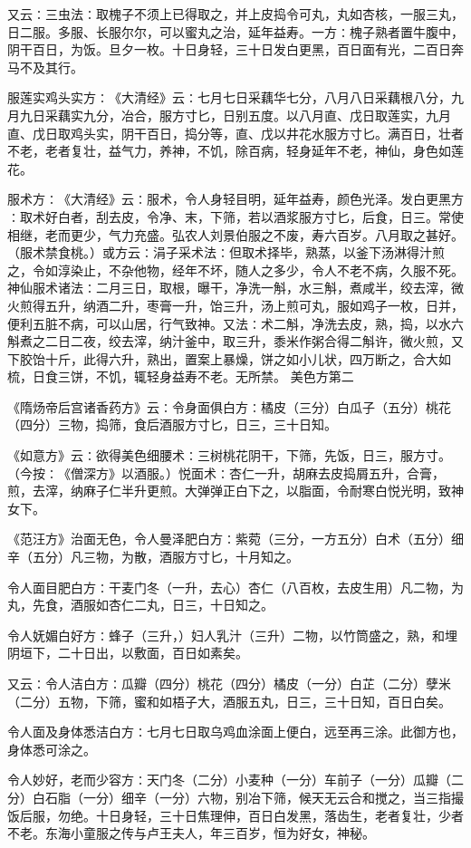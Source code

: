 \documentclass[a4paper,12pt,UTF8,twoside]{ctexbook}
\begin{document}
又云∶三虫法∶取槐子不须上已得取之，并上皮捣令可丸，丸如杏核，一服三丸，日二服。多服、长服尔尔，可以蜜丸之治，延年益寿。一方∶槐子熟者置牛腹中，阴干百日，为饭。旦夕一枚。十日身轻，三十日发白更黑，百日面有光，二百日奔马不及其行。

服莲实鸡头实方∶《大清经》云∶七月七日采藕华七分，八月八日采藕根八分，九月九日采藕实九分，冶合，服方寸匕，日别五度。以八月直、戊日取莲实，九月直、戊日取鸡头实，阴干百日，捣分等，直、戊以井花水服方寸匕。满百日，壮者不老，老者复壮，益气力，养神，不饥，除百病，轻身延年不老，神仙，身色如莲花。

服术方∶《大清经》云∶服术，令人身轻目明，延年益寿，颜色光泽。发白更黑方∶取术好白者，刮去皮，令净、末，下筛，若以酒浆服方寸匕，后食，日三。常使相继，老而更少，气力充盛。弘农人刘景伯服之不废，寿六百岁。八月取之甚好。（服术禁食桃。）或方云∶涓子采术法∶但取术择毕，熟蒸，以釜下汤淋得汁煎之，令如淳染止，不杂他物，经年不坏，随人之多少，令人不老不病，久服不死。神仙服术诸法∶二月三日，取根，曝干，净洗一斛，水三斛，煮咸半，绞去滓，微火煎得五升，纳酒二升，枣膏一升，饴三升，汤上煎可丸，服如鸡子一枚，日并，便利五脏不病，可以山居，行气致神。又法∶术二斛，净洗去皮，熟，捣，以水六斛煮之二日二夜，绞去滓，纳汁釜中，取三升，黍米作粥合得二斛许，微火煎，又下胶饴十斤，此得六升，熟出，置案上暴燥，饼之如小儿状，四万断之，合大如梳，日食三饼，不饥，辄轻身益寿不老。无所禁。
美色方第二

《隋炀帝后宫诸香药方》云∶令身面俱白方∶橘皮（三分）白瓜子（五分）桃花（四分）三物，捣筛，食后酒服方寸匕，日三，三十日知。

《如意方》云∶欲得美色细腰术∶三树桃花阴干，下筛，先饭，日三，服方寸。（今按∶《僧深方》以酒服。）悦面术∶杏仁一升，胡麻去皮捣屑五升，合膏，煎，去滓，纳麻子仁半升更煎。大弹弹正白下之，以脂面，令耐寒白悦光明，致神女下。

《范汪方》治面无色，令人曼泽肥白方∶紫菀（三分，一方五分）白术（五分）细辛（五分）凡三物，为散，酒服方寸匕，十月知之。

令人面目肥白方∶干麦门冬（一升，去心）杏仁（八百枚，去皮生用）凡二物，为丸，先食，酒服如杏仁二丸，日三，十日知之。

令人妩媚白好方∶蜂子（三升，）妇人乳汁（三升）二物，以竹筒盛之，熟，和埋阴垣下，二十日出，以敷面，百日如素矣。

又云∶令人洁白方∶瓜瓣（四分）桃花（四分）橘皮（一分）白芷（二分）孽米（二分）五物，下筛，蜜和如梧子大，酒服五丸，日三，三十日知，百日白矣。

令人面及身体悉洁白方∶七月七日取乌鸡血涂面上便白，远至再三涂。此御方也，身体悉可涂之。

令人妙好，老而少容方∶天门冬（二分）小麦种（一分）车前子（一分）瓜瓣（二分）白石脂（一分）细辛（一分）六物，别冶下筛，候天无云合和搅之，当三指撮饭后服，勿绝。十日身轻，三十日焦理伸，百日白发黑，落齿生，老者复壮，少者不老。东海小童服之传与卢王夫人，年三百岁，恒为好女，神秘。
\end{document}
